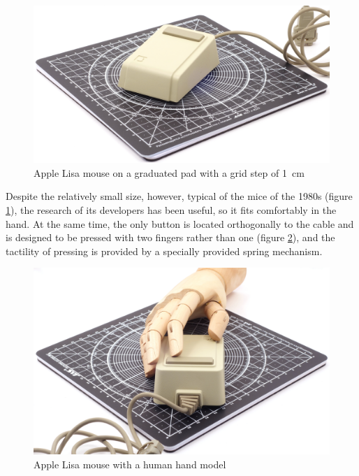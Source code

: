 \documentclass[11pt, a4paper]{article}
\begin{document}
\begin{figure}[h]
    \centering
    \includegraphics[scale=0.4]{1983_apple_lisa_mouse/applekovrik_60.jpg}
    \caption{Apple Lisa mouse on a graduated pad with a grid step of 1~cm}
    \label{fig:AppleLisaSize}
\end{figure}

Despite the relatively small size, however, typical of the mice of the 1980s (figure \ref{fig:AppleLisaSize}), the research of its developers has been useful, so it fits comfortably in the hand. At the same time, the only button is located orthogonally to the cable and is designed to be pressed with two fingers rather than one (figure \ref{fig:AppleLisaHand}), and the tactility of pressing is provided by a specially provided spring mechanism.

\begin{figure}[h]
    \centering
    \includegraphics[scale=0.4]{1983_apple_lisa_mouse/appleruka_60.jpg}
    \caption{Apple Lisa mouse with a human hand model}
    \label{fig:AppleLisaHand}
\end{figure}
\end{document}
